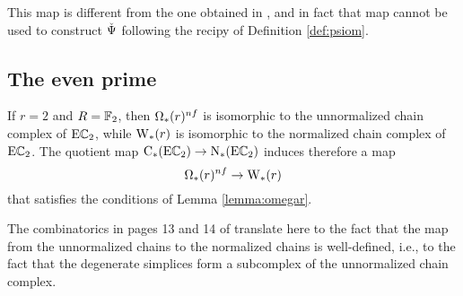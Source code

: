 This map is different from the one obtained in \cite[Prop.~6.16]{brumfiel2023explicit}, and in fact that map cannot be used to construct $\operatorname{\check{\Psi}}$ following the recipy of Definition \ref{def:psiom}.


\subsection{The even prime}\label{ss:even} If $r= 2$ and $R=\mathbb{F}_2$, then $\Omega_*(r)^{nf}$ is isomorphic to the unnormalized chain complex of $\mathrm{E}\mathbb{C}_2$, while $\operatorname{W}_{*}(r)$ is isomorphic to the normalized chain complex of $\mathrm{E}\mathbb{C}_2$. The quotient map $\operatorname{C}_{*}(\mathrm{E}\mathbb{C}_2)\to \operatorname{N}_{*}(\mathrm{E}\mathbb{C}_2)$ induces therefore a map
\[
\Omega_*(r)^{nf}\to \operatorname{W}_{*}(r)
\]
that satisfies the conditions of Lemma \ref{lemma:omegar}.
\begin{remark}
	The combinatorics in pages 13 and 14 of \cite{medina2021fast_sq} translate here to the fact that the map from the unnormalized chains to the normalized chains is well-defined, i.e., to the fact that the degenerate simplices form a subcomplex of the unnormalized chain complex.
\end{remark}